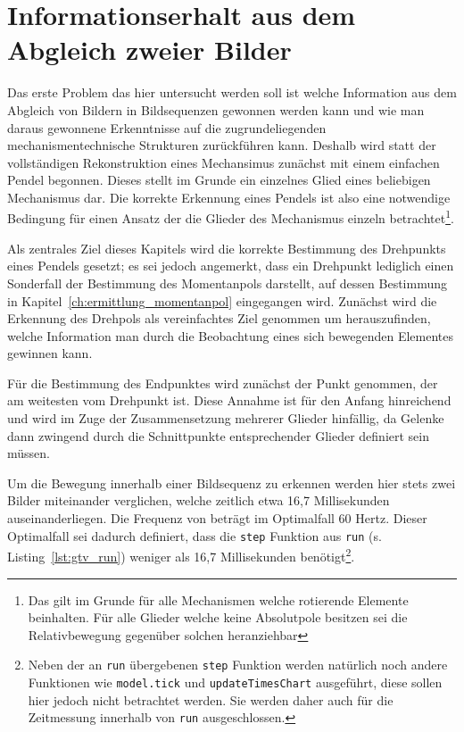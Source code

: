 
\chapter{Informationserhalt aus dem Abgleich zweier Bilder}\label{ch:infoerhalt_aus_abgleich_bilder}


Das erste Problem das hier untersucht werden soll ist welche Information aus dem Abgleich von Bildern in Bildsequenzen gewonnen werden kann und wie man daraus gewonnene Erkenntnisse auf die zugrundeliegenden mechanismentechnische Strukturen zurückführen kann.
Deshalb wird statt der vollständigen Rekonstruktion eines Mechansimus zunächst mit einem einfachen Pendel begonnen.
Dieses stellt im Grunde ein einzelnes Glied eines beliebigen Mechanismus dar.
Die korrekte Erkennung eines Pendels ist also eine notwendige Bedingung für einen Ansatz der die Glieder des Mechanismus einzeln betrachtet\footnote{Das gilt im Grunde für alle Mechanismen welche rotierende Elemente beinhalten. Für alle Glieder welche keine Absolutpole besitzen sei die Relativbewegung gegenüber solchen heranziehbar}.

Als zentrales Ziel dieses Kapitels wird die korrekte Bestimmung des Drehpunkts eines Pendels gesetzt; es sei jedoch angemerkt, dass ein Drehpunkt lediglich einen Sonderfall der Bestimmung des Momentanpols darstellt, auf dessen Bestimmung in Kapitel~\ref{ch:ermittlung_momentanpol} eingegangen wird.
Zunächst wird die Erkennung des Drehpols als vereinfachtes Ziel genommen um herauszufinden, welche Information man durch die Beobachtung eines sich bewegenden Elementes gewinnen kann.

Für die Bestimmung des Endpunktes wird zunächst der Punkt genommen, der am weitesten vom Drehpunkt ist.
Diese Annahme ist für den Anfang hinreichend und wird im Zuge der Zusammensetzung mehrerer Glieder hinfällig, da Gelenke dann zwingend durch die Schnittpunkte entsprechender Glieder definiert sein müssen.

Um die Bewegung innerhalb einer Bildsequenz zu erkennen werden hier stets zwei Bilder miteinander verglichen, welche zeitlich etwa 16,7 Millisekunden auseinanderliegen.
Die Frequenz von  beträgt im Optimalfall 60 Hertz.
Dieser Optimalfall sei dadurch definiert, dass die \lstinline{step} Funktion aus \lstinline{run} (s. Listing~\ref{lst:gtv_run}) weniger als 16,7 Millisekunden benötigt\footnote{Neben der an \lstinline{run} übergebenen \lstinline{step} Funktion werden natürlich noch andere Funktionen wie \lstinline{model.tick} und \lstinline{updateTimesChart} ausgeführt, diese sollen hier jedoch nicht betrachtet werden. Sie werden daher auch für die Zeitmessung innerhalb von \lstinline{run} ausgeschlossen.}.

